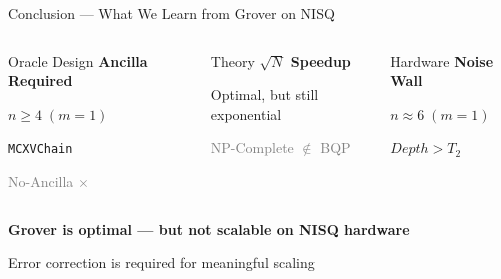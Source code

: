 \documentclass[aspectratio=169, 10pt]{beamer}
\begin{document}
\begin{frame}{Conclusion — What We Learn from Grover on NISQ}

    \begin{columns}[T]
    
    \begin{block}{\centering Oracle Design}
    \centering
    \Large \textbf{Ancilla Required}
    
    \vspace{0.2cm}
    \small
    $n \ge 4 \; (m = 1)$
    
    \texttt{MCXVChain} \checkmark
    
    \vspace{0.1cm}
    \textcolor{gray}{No-Ancilla \;\; $\times$}
    \end{block}
    
    \begin{block}{\centering Theory}
    \centering
    \Large \textbf{$\sqrt{N}$ Speedup}
    
    \vspace{0.2cm}
    \small
    Optimal, but still exponential
    
    \vspace{0.1cm}
    \textcolor{gray}{NP-Complete $\notin$ BQP}
    \end{block}
    
    \begin{alertblock}{\centering Hardware}
    \centering
    \Large \textbf{Noise Wall}
    
    \vspace{0.2cm}
    \small
    $n \approx 6 \; (m = 1)$
    
    \vspace{0.1cm}
    $Depth > T_2$
    \end{alertblock}
    
    \end{columns}
    
    \vspace{0.4cm}
    
    \centering
    \Large
    \textbf{{Grover is optimal — but not scalable on NISQ hardware}}
    
    \vspace{0.3cm}
    \small
    Error correction is required for meaningful scaling
    
\end{frame}
\end{document}
